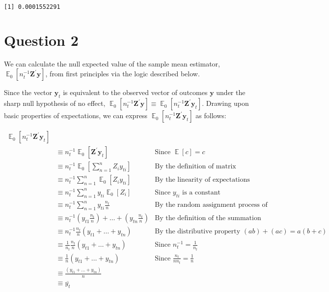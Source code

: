 \documentclass[
  12pt,
  leqno]{article}
\DeclareMathOperator{\E}{\mathbb{E}}
\begin{document}
\begin{verbatim}
[1] 0.0001552291
\end{verbatim}

\section*{Question 2}

We can calculate the null expected value of the sample mean estimator,
\(\E_0\left[n_t^{-1} \mathbf{Z}^{\prime}\mathbf{y}\right]\), from first
principles via the logic described below.

Since the vector \(\mathbf{y}_t\) is equivalent to the observed vector
of outcomes \(\mathbf{y}\) under the sharp null hypothesis of no effect,
\(\E_0\left[n_t^{-1} \mathbf{Z}^{\prime}\mathbf{y}\right] \equiv \E_0\left[n_t^{-1} \mathbf{Z}^{\prime}\mathbf{y}_t\right]\).
Drawing upon basic properties of expectations, we can express
\(\E_0\left[n_t^{-1} \mathbf{Z}^{\prime}\mathbf{y}_t\right]\) as
follows:

\begin{align*}
\E_0\left[n_t^{-1} \mathbf{Z}^{\prime}\mathbf{y}_t\right] \\
& \equiv n_t^{-1} \E_0\left[\mathbf{Z}^{\prime}\mathbf{y}_t\right] & \text{Since } \E\left[c\right] = c \\
& \equiv n_t^{-1} \E_0\left[\sum \limits_{n = 1}^n Z_i y_{ti}\right] & \text{By the definition of matrix multiplication} \\
& \equiv n_t^{-1} \sum \limits_{n = 1}^n \E_0\left[Z_i y_{ti}\right] & \text{By the linearity of expectations} \\
& \equiv n_t^{-1} \sum \limits_{n = 1}^n y_{ti} \E_0\left[Z_i\right] & \text{Since } y_{ti} \text{ is a constant} \\
& \equiv n_t^{-1} \sum \limits_{n = 1}^n y_{ti} \frac{n_t}{n} & \text{By the random assignment process of the experiment} \\
& \equiv n_t^{-1}  \left(y_{t1} \frac{n_t}{n}\right) + \dots + \left(y_{tn} \frac{n_t}{n}\right) & \text{By the definition of the summation operator} \\
& \equiv n_t^{-1} \frac{n_t}{n} \left(y_{t1} + \dots + y_{tn}\right) & \text{By the distributive property } (a b) + (a  c) = a(b + c) \\
& \equiv \frac{1}{n_t} \frac{n_t}{n} \left(y_{t1} + \dots + y_{tn}\right) & \text{Since } n_t^{-1} = \frac{1}{n_t} \\
& \equiv \frac{1}{n} \left(y_{t1} + \dots + y_{tn}\right) & \text{Since } \frac{n_t}{n n_t} = \frac{1}{n} \\
& \equiv \frac{\left(y_{t1} + \dots + y_{tn}\right)}{n} \\
& \equiv \overline{y_t}
\end{align*}
\end{document}
